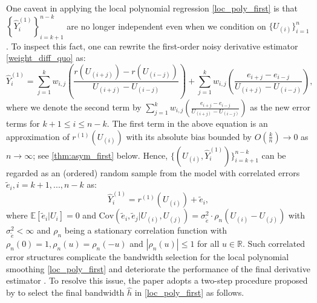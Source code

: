 \documentclass{uwstat572}
\theoremstyle{definition}
\renewcommand{\hat}{\widehat}
\renewcommand{\tilde}{\widetilde}
\theoremstyle{theorem}
\begin{document}
One caveat in applying the local polynomial regression \eqref{loc_poly_first} is that $\left\{\hat{Y}_i^{(1)}\right\}_{i=k+1}^{n-k}$ are no longer independent even when we condition on $\{U_{(i)}\}_{i=1}^n$. To inspect this fact, one can rewrite the first-order noisy derivative estimator \eqref{weight_diff_quo} as:
$$\hat{Y}_i^{(1)} = \sum_{j=1}^k w_{i,j} \left(\frac{r(U_{(i+j)}) - r(U_{(i-j)})}{U_{(i+j)} - U_{(i-j)}}\right) + \sum_{j=1}^k w_{i,j} \left(\frac{e_{i+j} - e_{i-j}}{U_{(i+j)} - U_{(i-j)}}\right),$$
where we denote the second term by $\sum_{j=1}^k w_{i,j} \left(\frac{e_{i+j} - e_{i-j}}{U_{(i+j)} - U_{(i-j)}}\right)$ as the new error terms for $k+1\leq i \leq n-k$. The first term in the above equation is an approximation of $r^{(1)}(U_{(i)})$ with its absolute bias bounded by $O\left(\frac{k}{n}\right) \to 0$ as $n\to \infty$; see \autoref{thm:asym_first} below. Hence, $\{(U_{(i)}, \hat{Y}_i^{(1)})\}_{i=k+1}^{n-k}$ can be regarded as an (ordered) random sample from the model with correlated errors $\tilde{e}_i,i=k+1,...,n-k$ as:
\begin{equation}
\label{rand_design_first_cor}
\hat{Y}_i^{(1)} = r^{(1)}(U_{(i)}) + \tilde{e}_i,
\end{equation}
where $\mathbb{E}\left[\tilde{e}_i|U_i\right]=0$ and $\mathrm{Cov}\left(\tilde{e}_i,\tilde{e}_j | U_{(i)},U_{(j)} \right) = \sigma_{\tilde{e}}^2 \cdot \rho_n(U_{(i)}-U_{(j)})$ with $\sigma_{\tilde{e}}^2 <\infty$ and $\rho_n$ being a stationary correlation function with $\rho_n(0)=1, \rho_n(u) = \rho_n(-u)$ and $|\rho_n(u)|\leq 1$ for all $u\in \mathbb{R}$. Such correlated error structures complicate the bandwidth selection for the local polynomial smoothing \eqref{loc_poly_first} and deteriorate the performance of the final derivative estimator \citep{opsomer2001nonparametric,de2018local}. To resolve this issue, the paper adopts a two-step procedure proposed by \cite{de2018local} to select the final bandwidth $\hat{h}$ in \eqref{loc_poly_first} as follows.
\end{document}
